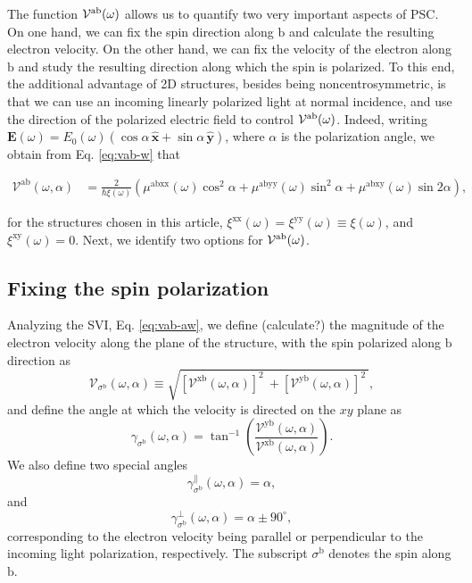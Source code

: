 \documentclass[floatfix,prb,aps,superscriptaddress,showpacs,11pt,preprint,letterpaper]{revtex4}
\begin{document}
The function ${\cal V}^{\mathrm{a}\mathrm{b}}(\omega)$ allows us to quantify
two very important aspects of PSC. On one hand, we can fix the spin direction
along $\mathrm{b}$ and calculate the resulting electron velocity. On the other
hand, we can fix the velocity of the electron along $\mathrm{b}$ and study the
resulting direction along which the spin is polarized. To this end, the
additional advantage of  2D structures, besides being noncentrosymmetric, is
that we can use an incoming linearly polarized  light at normal incidence, and
use the  direction of the polarized  electric field to control ${\cal
V}^{\mathrm{a}\mathrm{b}}(\omega)$. Indeed, writing ${\mathbf E}(\omega) =
E_0(\omega)(\cos\alpha\,\hat{\mathbf x}+\sin\alpha\,\hat{\mathbf y})$, where
$\alpha$ is the polarization angle, we obtain from Eq. \eqref{eq:vab-w} that
\begin{widetext}
\begin{align}
\mathcal{V}^{\mathrm{ab}}(\omega,\alpha)
&= 
\frac{2}{\hbar\xi(\omega)}
\left(\mu^{\mathrm{abxx}}(\omega)\cos^{2}\alpha + 
\mu^{\mathrm{abyy}}(\omega)\sin^{2}\alpha + 
\mu^{\mathrm{abxy}}(\omega)\sin 2\alpha\right)
,
\label{eq:vab-aw}
\end{align}
\end{widetext}
for the structures chosen in this article,
$\xi^{\mathrm{xx}}(\omega)=\xi^{\mathrm{yy}}(\omega)\equiv\xi(\omega)$, and
$\xi^{\mathrm{xy}}(\omega)=0$. Next, we identify two options for ${\cal
V}^{\mathrm{a}\mathrm{b}}(\omega)$.

\subsection{Fixing the spin polarization}\label{sec:theory-fixspin}

Analyzing the SVI, Eq. \eqref{eq:vab-aw}, we define {\color{red}(calculate?)} the magnitude
of the electron velocity along the plane of the structure, with the spin
polarized along $\mathrm{b}$ direction as
\begin{equation}
\mathcal{V}_{\sigma^{\mathrm{b}}}(\omega,\alpha)
\equiv
\sqrt{
[\mathcal{V}^{\mathrm{xb}}(\omega,\alpha)]^{2}\ +
[\mathcal{V}^{\mathrm{yb}}(\omega,\alpha)]^{2}\ 
}, 
\label{eq:vs-mag}
\end{equation}
and define the angle at which the velocity is directed on the $xy$ plane as
\begin{equation}
\gamma_{\sigma^\mathrm{b}} (\omega,\alpha)
=
\tan^{-1} \left( \frac{\mathcal{V}^{\mathrm{yb}}(\omega,\alpha)}
{\mathcal{V}^{\mathrm{xb}}(\omega,\alpha)} \right)
.
\label{eq:gamma-ang}
\end{equation}
We also define two special angles
\begin{equation}
\gamma_{\sigma^\mathrm{b}}^\parallel(\omega,\alpha) = \alpha, 
\label{eq:gamma-par} 
\end{equation}
and
\begin{equation}
\gamma_{\sigma^\mathrm{b}}^\perp(\omega,\alpha) = \alpha \pm 90^{\circ},
\label{eq:gamma-perp}
\end{equation}
corresponding to the electron velocity being parallel or perpendicular to the
incoming light polarization, respectively. The subscript $\sigma^\mathrm{b}$
denotes the spin along $\mathrm{b}$.
\end{document}

